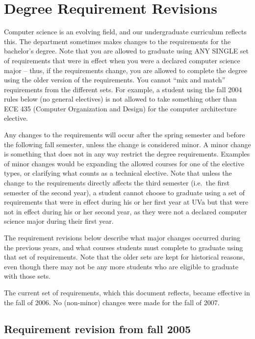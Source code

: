 \documentclass[12pt,twoside]{article}
\begin{document}

\section{Degree Requirement Revisions}
\label{sec:degreereqrevisions}

Computer science is an evolving field, and our undergraduate
curriculum reflects this.  The department sometimes makes changes to
the requirements for the bachelor's degree.  Note that you are allowed
to graduate using ANY SINGLE set of requirements that were in effect
when you were a declared computer science major -- thus, if the
requirements change, you are allowed to complete the degree using the
older version of the requirements.  You cannot ``mix and match''
requirements from the different sets.  For example, a student using
the fall 2004 rules below (no general electives) is not allowed to
take something other than ECE 435 (Computer Organization and Design)
for the computer architecture elective.

Any changes to the requirements will occur after the spring semester
and before the following fall semester, unless the change is
considered minor.  A minor change is something that does not in any
way restrict the degree requirements.  Examples of minor changes would
be expanding the allowed courses for one of the elective types, or
clarifying what counts as a technical elective.  Note that unless the
change to the requirements directly affects the third semester (i.e.\
the first semester of the second year), a student cannot choose to
graduate using a set of requirements that were in effect during his or
her first year at UVa but that were not in effect during his or her
second year, as they were not a declared computer science major during
their first year.

The requirement revisions below describe what major changes occurred
during the previous years, and what courses students must complete to
graduate using that set of requirements.  Note that the older sets are
kept for historical reasons, even though there may not be any more
students who are eligible to graduate with those sets.

The current set of requirements, which this document reflects, became
effective in the fall of 2006.  No (non-minor) changes were made for
the fall of 2007.

\subsection{Requirement revision from fall 2005}
\end{document}
